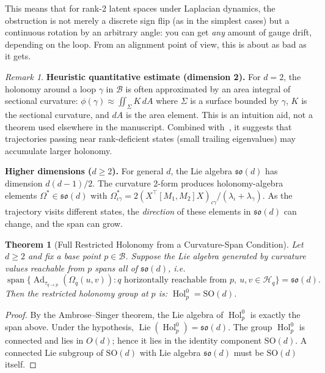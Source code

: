 \documentclass{article}
\newcommand{\so}{\mathfrak{so}}
\DeclareMathOperator{\Hol}{Hol}
\DeclareMathOperator{\Lie}{Lie}
\DeclareMathOperator{\Ad}{Ad}
\DeclareMathOperator{\spn}{span}
\theoremstyle{plain}
\newtheorem{theorem}{Theorem}
\theoremstyle{definition}
\theoremstyle{remark}
\newtheorem*{remark}{Remark}
\begin{document}
This means that for rank-2 latent spaces under Laplacian dynamics, the obstruction is not merely a discrete sign flip (as in the simplest cases) but a continuous rotation by an arbitrary angle: you can get \emph{any} amount of gauge drift, depending on the loop. From an alignment point of view, this is about as bad as it gets.

\begin{remark}
\textbf{Heuristic quantitative estimate (dimension 2).}
For $d = 2$, the holonomy around a loop $\gamma$ in $\mathcal{B}$ is often approximated by an area integral of sectional curvature:
$\phi(\gamma) \approx \iint_\Sigma K \, dA$
where $\Sigma$ is a surface bounded by $\gamma$, $K$ is the sectional curvature, and $dA$ is the area element.
This is an intuition aid, not a theorem used elsewhere in the manuscript.
Combined with~\citet{massart2019curvature}, it suggests that trajectories passing near rank-deficient states (small trailing eigenvalues) may accumulate larger holonomy.
\end{remark}

\textbf{Higher dimensions ($d \ge 2$).}
For general $d$, the Lie algebra $\so(d)$ has dimension $d(d-1)/2$.
The curvature 2-form produces holonomy-algebra elements $\Omega^* \in \so(d)$ with
$\Omega^*_{\iota\gamma} = 2(X^\top [M_1, M_2] X)_{\iota\gamma} / (\lambda_\iota + \lambda_\gamma)$.
As the trajectory visits different states, the \emph{direction} of these elements in $\so(d)$ can change, and the span can grow.

\begin{theorem}[Full Restricted Holonomy from a Curvature-Span Condition]\label{thm:full-holonomy-conditional}
Let $d \ge 2$ and fix a base point $p \in \mathcal{B}$.
Suppose the Lie algebra generated by curvature values reachable from $p$ spans all of $\so(d)$, i.e.
\begin{equation}
\spn\{ \Ad_{\tau_{q \to p}} (\Omega_q(u, v)) : q \text{ horizontally reachable from } p,~u,v \in \mathcal{H}_q \} = \so(d).
\end{equation}
Then the restricted holonomy group at $p$ is:
$\Hol_p^0 = \mathrm{SO}(d)$.
\end{theorem}

\begin{proof}
By the Ambrose--Singer theorem, the Lie algebra of $\Hol_p^0$ is exactly the span above.
Under the hypothesis, $\Lie(\Hol_p^0) = \so(d)$.
The group $\Hol_p^0$ is connected and lies in $O(d)$; hence it lies in the identity component $\mathrm{SO}(d)$.
A connected Lie subgroup of $\mathrm{SO}(d)$ with Lie algebra $\so(d)$ must be $\mathrm{SO}(d)$ itself.
\end{proof}
\end{document}
